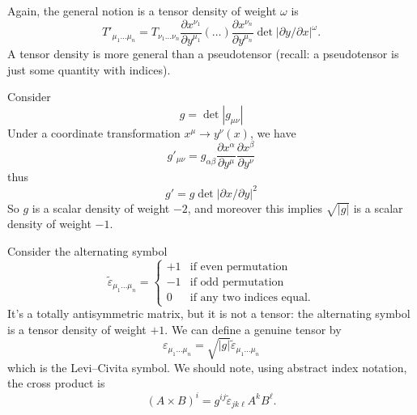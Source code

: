 Again, the general notion
is a tensor density of weight $\omega$ is
\begin{equation}
T'_{\mu_{1}\dots\mu_{n}}=T_{\nu_{1}\dots\nu_{n}}
\frac{\partial x^{\nu_{1}}}{\partial y^{\mu_{1}}}(\dots)
\frac{\partial x^{\nu_{n}}}{\partial y^{\mu_{n}}}
\det|\partial y/\partial x|^{\omega}.
\end{equation}
A tensor density is more general than a pseudotensor (recall: a
pseudotensor is just some quantity with indices).

\begin{ex}
Consider
\begin{equation}
g=\det|g_{\mu\nu}|
\end{equation}
Under a coordinate transformation $x^{\mu}\to y^{\nu}(x)$, we have
\begin{equation}
g'_{\mu\nu}=g_{\alpha\beta}\frac{\partial x^{\alpha}}{\partial y^{\mu}}
\frac{\partial x^{\beta}}{\partial y^{\nu}}
\end{equation}
thus
\begin{equation}
g'=g\det|\partial x/\partial y|^{2}
\end{equation}
So $g$ is a scalar density of weight $-2$, and moreover this
implies $\sqrt{|g|}$ is a scalar density of weight $-1$.
\end{ex}

\begin{ex}
Consider the alternating symbol
\begin{equation}
\widetilde{\varepsilon}_{\mu_{1}\dots\mu_{n}}
=\begin{cases}
+1 & \mbox{if even permutation}\\
-1 & \mbox{if odd permutation}\\
0 & \mbox{if any two indices equal.}
\end{cases}
\end{equation}
It's a totally antisymmetric matrix, but it is not a tensor: the
alternating symbol is a tensor density of weight $+1$. We can
define a genuine tensor by
\begin{equation}
\varepsilon_{\mu_{1}\dots\mu_{n}}=\sqrt{|g|}\widetilde{\varepsilon}_{\mu_{1}\dots\mu_{n}}
\end{equation}
which is the Levi--Civita symbol. We
should note, using abstract index notation, the cross product is
\begin{equation}
(A\times B)^{i}=g^{ij}\widetilde{\varepsilon}_{jk\ell}A^{k}B^{\ell}.
\end{equation}
\end{ex}
